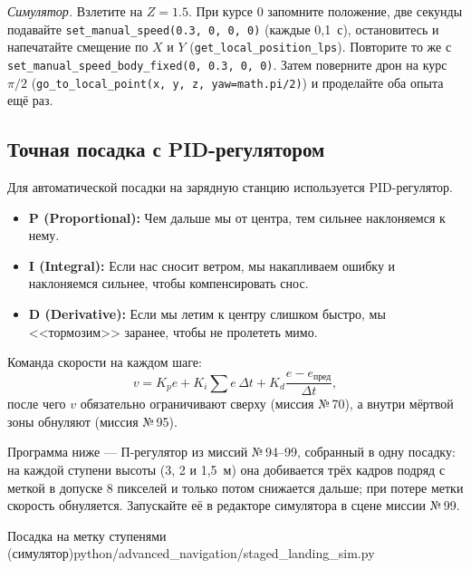 \begin{taskbox}
\emph{Симулятор.} Взлетите на $Z = 1.5$. При курсе 0 запомните положение, две секунды подавайте \verb|set_manual_speed(0.3, 0, 0, 0)| (каждые 0,1~с), остановитесь и напечатайте смещение по $X$ и $Y$ (\verb|get_local_position_lps|). Повторите то же с \verb|set_manual_speed_body_fixed(0, 0.3, 0, 0)|. Затем поверните дрон на курс $\pi/2$ (\verb|go_to_local_point(x, y, z, yaw=math.pi/2)|) и проделайте оба опыта ещё раз.
\end{taskbox}

\subsection{Точная посадка с PID-регулятором}
Для автоматической посадки на зарядную станцию используется PID-регулятор.
\begin{itemize}
    \item \textbf{P (Proportional):} Чем дальше мы от центра, тем сильнее наклоняемся к нему.
    \item \textbf{I (Integral):} Если нас сносит ветром, мы накапливаем ошибку и наклоняемся сильнее, чтобы компенсировать снос.
    \item \textbf{D (Derivative):} Если мы летим к центру слишком быстро, мы <<тормозим>> заранее, чтобы не пролететь мимо.
\end{itemize}
Команда скорости на каждом шаге:
$$ v = K_p e + K_i \sum e \,\Delta t + K_d \frac{e - e_{\text{пред}}}{\Delta t}, $$
после чего $v$ обязательно ограничивают сверху (миссия №\,70), а внутри мёртвой зоны обнуляют (миссия №\,95).

Программа ниже --- П-регулятор из миссий №\,94--99, собранный в одну посадку: на каждой ступени высоты (3, 2 и 1,5~м) она добивается трёх кадров подряд с меткой в допуске 8 пикселей и только потом снижается дальше; при потере метки скорость обнуляется. Запускайте её в редакторе симулятора в сцене миссии №\,99.

\begin{codefiletitle}[python]{Посадка на метку ступенями (симулятор)}{python/advanced_navigation/staged_landing_sim.py}
\end{codefiletitle}

